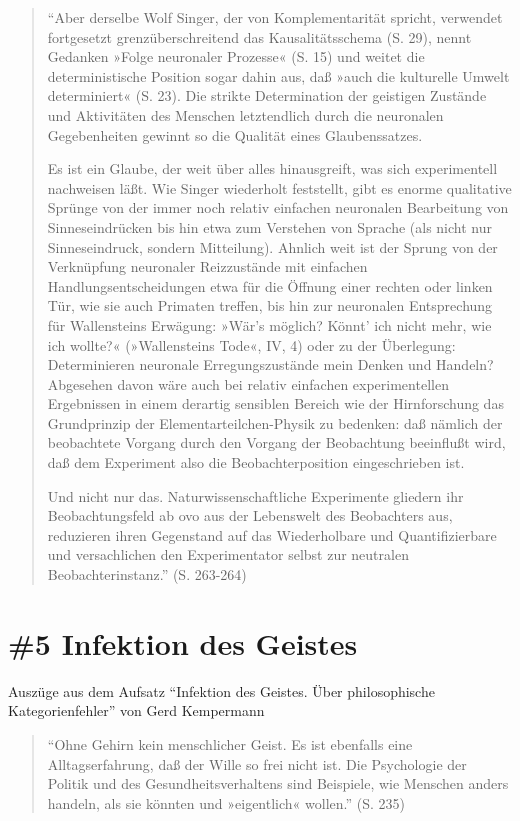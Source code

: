 \documentclass[
  a4paper,
]{report}
\begin{document}
\begin{quote}
``Aber derselbe Wolf Singer, der von Komplementarität spricht, verwendet fortgesetzt grenzüberschreitend das Kausalitätsschema (S. 29), nennt Gedanken »Folge neuronaler Prozesse« (S. 15) und weitet die deterministische Position sogar dahin aus, daß »auch die kulturelle Umwelt determiniert« (S. 23). Die strikte Determination der geistigen Zustände und Aktivitäten des Menschen letztendlich durch die neuronalen Gegebenheiten gewinnt so die Qualität eines Glaubenssatzes.

Es ist ein Glaube, der weit über alles hinausgreift, was sich experimentell nachweisen läßt. Wie Singer wiederholt feststellt, gibt es enorme qualitative Sprünge von der immer noch relativ einfachen neuronalen Bearbeitung von Sinneseindrücken bis hin etwa zum Verstehen von Sprache (als nicht nur Sinneseindruck, sondern Mitteilung). Ahnlich weit ist der Sprung von der Verknüpfung neuronaler Reizzustände mit einfachen Handlungsentscheidungen etwa für die Öffnung einer rechten oder linken Tür, wie sie auch Primaten treffen, bis hin zur neuronalen Entsprechung für Wallensteins Erwägung: »Wär's möglich? Könnt' ich nicht mehr, wie ich wollte?« (»Wallensteins Tode«, IV, 4) oder zu der Überlegung: Determinieren neuronale Erregungszustände mein Denken und Handeln? Abgesehen davon wäre auch bei relativ einfachen experimentellen Ergebnissen in einem derartig sensiblen Bereich wie der Hirnforschung das Grundprinzip der Elementarteilchen-Physik zu bedenken: daß nämlich der beobachtete Vorgang durch den Vorgang der Beobachtung beeinflußt wird, daß dem Experiment also die Beobachterposition eingeschrieben ist.

Und nicht nur das. Naturwissenschaftliche Experimente gliedern ihr Beobachtungsfeld ab ovo aus der Lebenswelt des Beobachters aus, reduzieren ihren Gegenstand auf das Wiederholbare und Quantifizierbare und versachlichen den Experimentator selbst zur neutralen Beobachterinstanz.'' (S. 263-264)
\end{quote}

\hypertarget{pr-ev5}{%
\section{\#5 Infektion des Geistes}\label{pr-ev5}}

Auszüge aus dem Aufsatz ``Infektion des Geistes. Über philosophische Kategorienfehler'' von Gerd Kempermann \citeyearpar{Kempermann2004}

\begin{quote}
``Ohne Gehirn kein menschlicher Geist. Es ist ebenfalls eine Alltagserfahrung, daß der Wille so frei nicht ist. Die Psychologie der Politik und des Gesundheitsverhaltens sind Beispiele, wie Menschen anders handeln, als sie könnten und »eigentlich« wollen.'' (S. 235)
\end{quote}
\end{document}
